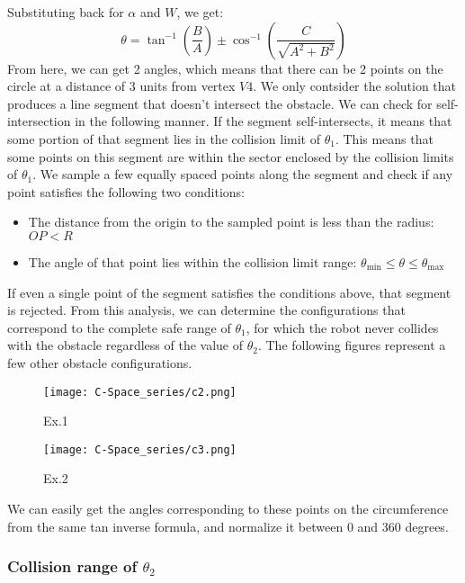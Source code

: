 \documentclass[12pt]{article}
\begin{document}
Substituting back for $\alpha$ and $W$, we get:
\[
\theta = \tan^{-1}\left(\frac{B}{A}\right) \pm \cos^{-1}\left(\frac{C}{\sqrt{A^2 + B^2}}\right)
\]
\newline
\newline
From here, we can get 2 angles, which means that there can be 2 points on the circle at a distance of 3 units from vertex $V4$. We only contsider the solution that produces a line segment that doesn't intersect the obstacle.
\newline
We can check for self-intersection in the following manner. If the segment self-intersects, it means that some portion of that segment lies in the collision limit of $\theta_1$. This means that some points on this segment are within the sector enclosed by the collision limits of $\theta_1$.
\newline
We sample a few equally spaced points along the segment and check if any point satisfies the following two conditions:
\begin{itemize}
    \item The distance from the origin to the sampled point is less than the radius: \( OP < R \)
    \item The angle of that point lies within the collision limit range: \( \theta_{\text{min}} \leq \theta \leq \theta_{\text{max}} \)
\end{itemize}
If even a single point of the segment satisfies the conditions above, that segment is rejected.
\newline
\newline
From this analysis, we can determine the configurations that correspond to the complete safe range of \(\theta_1\), for which the robot never collides with the obstacle regardless of the value of \(\theta_2\). The following figures represent a few other obstacle configurations.
\begin{figure}[h!]
    \centering
    \begin{minipage}{0.49\textwidth}
        \centering
        \texttt{[image: C-Space\_series/c2.png]}
        \caption{Ex.1}
        \label{fig:c2}
    \end{minipage}
    \hfill
    \begin{minipage}{0.49\textwidth}
        \centering
        \texttt{[image: C-Space\_series/c3.png]}
        \caption{Ex.2}
        \label{fig:c3}
    \end{minipage}
\end{figure}
\newline
We can easily get the angles corresponding to these points on the circumference from the same tan inverse formula, and normalize it between 0 and 360 degrees.
\clearpage
\subsubsection{Collision range of $\theta_2$}
\end{document}
